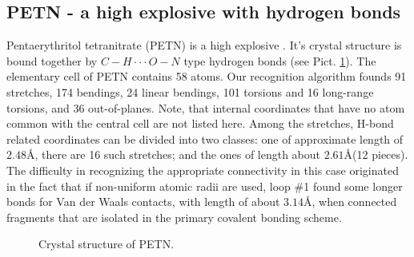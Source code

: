 \documentclass[prl,aps,preprint,superbib,12pt]{revtex4}
\begin{document}
\subsection{PETN - a high explosive with hydrogen bonds}
Pentaerythritol tetranitrate (PETN) is a high explosive 
\cite{Conant_1979}. It's crystal structure is bound together
by $C-H \cdot\cdot\cdot O-N$ type hydrogen bonds (see Pict. \ref{PETN}).
The elementary cell of PETN contains 58 atoms.
Our recognition algorithm founds 91 stretches, 174 bendings,
24 linear bendings, 101 torsions and 16 long-range torsions, 
and 36 out-of-planes. Note, that internal coordinates
that have no atom common with the central cell are not listed here.
Among the stretches, H-bond related coordinates can be divided into 
two classes: one of approximate length of $2.48$\AA, there are
16 such stretches; and the ones of length about $2.61$\AA (12 pieces).
The difficulty in recognizing the appropriate connectivity in this case
originated in the fact that if non-uniform atomic radii are used,
loop \#1 found some longer bonds for Van der Waals contacts, with 
length of about $3.14$\AA, when connected fragments that are 
isolated in the primary covalent bonding scheme.
\begin{figure}[h]
\caption{
Crystal structure of PETN.
\label{PETN}
}
\end{figure}
\end{document}
